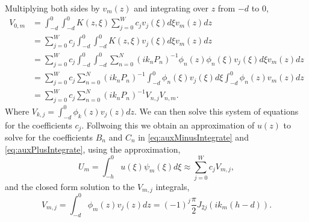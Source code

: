 \documentclass[a4paper,12pt]{report}
\begin{document}
Multiplying both sides by $v_m(z)$ and integrating over $z$ from $-d$ to $0$,
\begin{align}
\label{eq:galerkinIntegrate}
V_{0,m} &= \int_{-d}^0 \int_{-d}^0 K(z,\xi) \sum_{j=0}^{W} c_j v_j(\xi)  d\xi v_m(z) dz\nonumber\\
&= \sum_{j=0}^{W} c_j \int_{-d}^0 \int_{-d}^0 K(z,\xi) v_j(\xi)  d\xi v_m(z) dz\nonumber\\
&= \sum_{j=0}^{W} c_j \int_{-d}^0 \int_{-d}^0 \sum^N_{n=0} (ik_n P_n)^{-1} \phi_n(z)\phi_n(\xi) v_j(\xi) d\xi v_m(z) dz\nonumber\\
&= \sum_{j=0}^{W} c_j \sum^N_{n=0} (ik_n P_n)^{-1} \int_{-d}^0  \phi_n(\xi) v_j(\xi) d\xi \int_{-d}^0\phi_n(z) v_m(z) dz \nonumber\\
&= \sum_{j=0}^{W} c_j \sum^N_{n=0} (ik_n P_n)^{-1}  V_{n,j} V_{n,m}.
\end{align}
Where $V_{k,j} = \int_{-d}^0 \phi_k(z) v_j(z) dz$. We can then solve this system of equations for the coefficients $c_j$. Follwoing this we obtain an approximation of $u(z)$ to solve for the coefficients $B_n$ and $C_n$ in \ref{eq:auxMinusIntegrate} and \ref{eq:auxPlusIntegrate}, using the approximation,
\begin{equation}
\label{eq:galerkinApproxU}
U_m = \int_{-h}^{0} u(\xi) \psi_m(\xi) d\xi \approx \sum_{j=0}^{W} c_j V_{m,j},
\end{equation}
and the closed form solution \cite{bateman1954} to the $V_{m,j}$ integrals,
\begin{equation}
\label{eq:VIntegral}
V_{m,j} = \int_{-d}^{0} \phi_m(z) v_j(z) dz = (-1)^j \frac{\pi}{2} J_{2j}(ik_m(h-d)).
\end{equation}
         
{}



\newpage
\appendix
\end{document}
